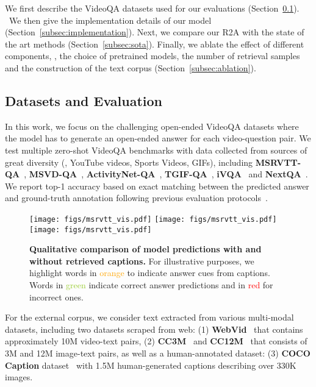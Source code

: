 We first describe the VideoQA datasets used for our evaluations (Section~\ref{subsec:data}). \
We then give the implementation details of our model (Section~\ref{subsec:implementation}). Next, we compare our R2A with the state of the art methods
(Section~\ref{subsec:sota}). 
Finally, we ablate the effect of different components, \eg, the choice of pretrained models, the number of retrieval samples and the construction of the text corpus (Section~\ref{subsec:ablation}). 


\subsection{Datasets and Evaluation} 
\label{subsec:data}
In this work, we focus on the challenging open-ended VideoQA datasets where the model has to generate an open-ended answer for each video-question pair. We test multiple zero-shot VideoQA benchmarks with data collected from sources of great diversity  (\ie, YouTube videos, Sports Videos, GIFs), including \textbf{MSRVTT-QA}~\cite{msrvtt}, \textbf{MSVD-QA}~\cite{msrvtt}, \textbf{ActivityNet-QA}~\cite{activitynet-qa}, \textbf{TGIF-QA}~\cite{tgif}, \textbf{iVQA}~\cite{justask} and \textbf{NextQA}~\cite{xiao2021next}.
We report top-1 accuracy based on exact matching between the predicted answer and ground-truth annotation following previous evaluation protocols~\cite{allinone}. 
\begin{figure*}
    \centering
    \texttt{[image: figs/msrvtt\_vis.pdf]}
    \texttt{[image: figs/msrvtt\_vis.pdf]}
    \texttt{[image: figs/msrvtt\_vis.pdf]}
\vspace{-3mm}
    \caption{{\bf Qualitative comparison of model predictions with and without retrieved captions.}  For illustrative purposes, we highlight words in \textcolor{orange}{orange} to indicate  answer cues from captions. Words in \textcolor{YellowGreen}{green} indicate correct answer predictions and in \textcolor{red}{red} for incorrect ones.}
    \vspace{-3mm}
    \label{fig:vis}
\end{figure*} 
For the external corpus, we consider text extracted from various multi-modal datasets, including two datasets scraped from web: (1) \textbf{WebVid}~\cite{frozenintime} that contains approximately 10M video-text pairs,
(2) \textbf{CC3M}~\cite{cc} and \textbf{CC12M}~\cite{cc12m} that consists of 3M and 12M image-text pairs, as well as a human-annotated dataset: (3) \textbf{COCO Caption} dataset~\cite{coco} with 1.5M human-generated captions describing over 330K images. 




